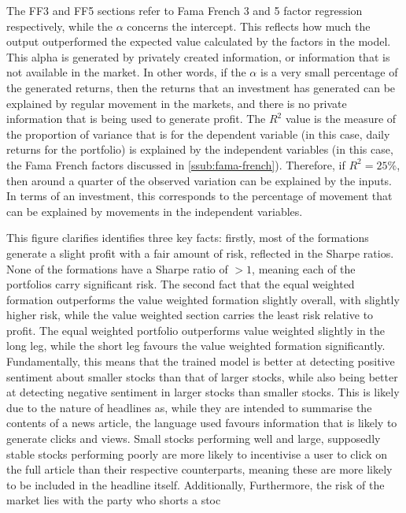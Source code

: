The FF3 and FF5 sections refer to Fama French 3 and 5 factor regression respectively, while the $\alpha$ concerns the intercept. This reflects how much the output outperformed the expected value calculated by the factors in the model. This alpha is generated by privately created information, or information that is not available in the market. In other words, if the $\alpha$ is a very small percentage of the generated returns, then the returns that an investment has generated can be explained by regular movement in the markets, and there is no private information that is being used to generate profit. The $R^2$ value is the measure of the proportion of variance that is for the dependent variable (in this case, daily returns for the portfolio) is explained by the independent variables (in this case, the Fama French factors discussed in \ref{ssub:fama-french}). Therefore, if $R^2 = 25\%$, then around a quarter of the observed variation can be explained by the inputs. In terms of an investment, this corresponds to the percentage of movement that can be explained by movements in the independent variables.

This figure clarifies identifies three key facts: firstly, most of the formations generate a slight profit with a fair amount of risk, reflected in the Sharpe ratios. None of the formations have a Sharpe ratio of $>1$, meaning each of the portfolios carry significant risk. The second fact that the equal weighted formation outperforms the value weighted formation slightly overall, with slightly higher risk, while the value weighted section carries the least risk relative to profit. The equal weighted portfolio outperforms value weighted slightly in the long leg, while the short leg favours the value weighted formation significantly. Fundamentally, this means that the trained model is better at detecting positive sentiment about smaller stocks than that of larger stocks, while also being better at detecting negative sentiment in larger stocks than smaller stocks. This is likely due to the nature of headlines as, while they are intended to summarise the contents of a news article, the language used favours information that is likely to generate clicks and views. Small stocks performing well and large, supposedly stable stocks performing poorly are more likely to incentivise a user to click on the full article than their respective counterparts, meaning these are more likely to be included in the headline itself. Additionally,  Furthermore, the risk of the market lies with the party who shorts a stoc %

